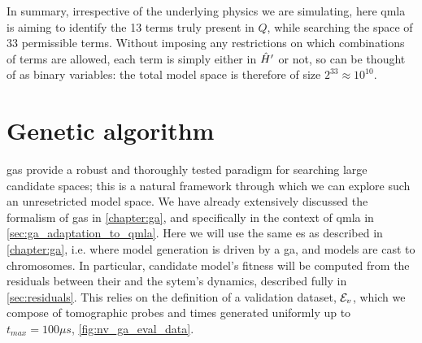 In summary, irrespective of the underlying physics we are simulating, 
    here \gls{qmla} is aiming to identify the 13 terms truly present in $Q$, 
    while searching the space of 33 permissible terms. 
Without imposing any restrictions on which combinations of terms are allowed, 
    each term is simply either in $\hat{H}^{\prime}$ or not, so can be thought of as binary variables:
    the total model space is therefore of size $2^{33} \approx 10^{10}$. 

\section{Genetic algorithm}
\glspl{ga} provide a robust and thoroughly tested paradigm for searching large candidate spaces; 
    this is a natural framework through which we can explore such an unresetricted model space. 
We have already extensively discussed the formalism of \glspl{ga} in \cref{chapter:ga}, 
    and specifically in the context of \gls{qmla} in \cref{sec:ga_adaptation_to_qmla}.
Here we will use the same \gls{es} as described in \cref{chapter:ga}, 
    i.e. where model generation is driven by a \gls{ga}, 
    and models are cast to chromosomes. 
In particular, candidate model's fitness will be computed from the residuals
    between their and the sytem's dynamics, described fully in \cref{sec:residuals}. 
This  relies on the definition of a validation dataset, ${ \mathcal{E} }_v$,
    which we compose of tomographic probes and times generated uniformly up to 
    $t_{max} = 100 \mu s$, \cref{fig:nv_ga_eval_data}. 

